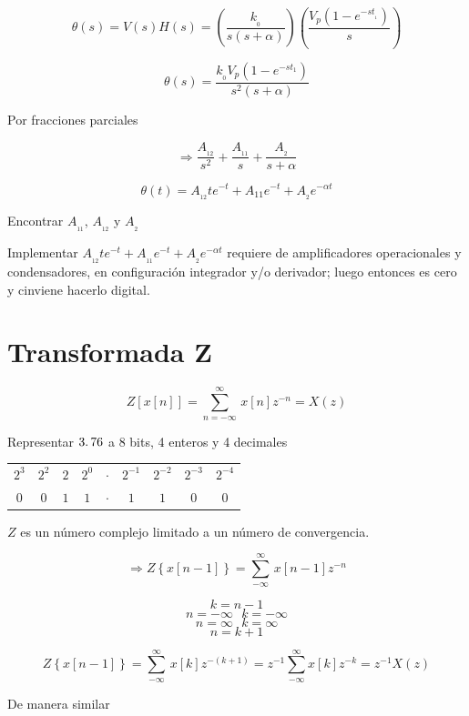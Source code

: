 $$\theta(s) = V(s)H(s) = \left( \dfrac{k_{_{0}}}{s(s + \alpha)} \right) \left( \dfrac{V_{p}(1 - e^{-st_{_{1}}})}{s} \right)  $$

$$\theta(s) = \dfrac{k_{_{0}}V_{p}(1 - e^{-st_{1}})}{s^2(s + \alpha)}$$

Por fracciones parciales

$$\Rightarrow \dfrac{A_{_{12}}}{s^2} + \dfrac{A_{_{11}}}{s} + \dfrac{A_{_{2}}}{s + \alpha}$$

$$\theta(t) = A_{_{12}} te^{-t} + A_{11}e^{-t} + A_{_{2}}e^{-\alpha t}$$

Encontrar $A_{_{11}}$, $A_{_{12}}$ y $A_{_{2}}$


Implementar $A_{_12}te^{-t} + A_{_{11}}e^{-t} + A_{_{2}}e^{-\alpha t}$ requiere de amplificadores operacionales y condensadores, en configuración integrador y/o derivador; luego entonces es cero y cinviene hacerlo digital.


\section{Transformada Z}

$$Z\left[ x[n] \right] = \displaystyle \sum_{n = -\infty}^{\infty}\, x[n]z^{-n} = X(z)$$


Representar $3\ldotp76$ a 8 bits, 4 enteros y 4 decimales

\begin{table}
	\begin{tabular}{ccccccccc}
		$2^3$ & $2^2$ & $2$ & $2^0$ & $\cdotp$ & $2^{-1}$ & $2^{-2}$ & $2^{-3}$ & $2^{-4}$    \\
		$0$ & $0$ & $1$ & $1$ & $\cdotp$ & $1$ & $1$ & $0$ & $0$
	\end{tabular}
\end{table}

$Z$ es un número complejo limitado a un número de convergencia.

$$\Rightarrow Z\left\lbrace x[n - 1] \right\rbrace = \displaystyle \sum_{-\infty}^{\infty}\, x[n - 1]z^{-n}$$

$$k = n - 1$$
$$n = -\infty \:\:\: k = -\infty$$
$$n = \infty \:\:\: k = \infty$$
$$n = k + 1$$

$$Z\left\lbrace x[n - 1] \right\rbrace = \displaystyle \sum_{- \infty}^{\infty} \, x[k]z^{-(k + 1)} = z^{-1} \displaystyle \sum_{-\infty}^{\infty} x[k]z^{-k} = z^{-1} X(z)$$

De manera similar

